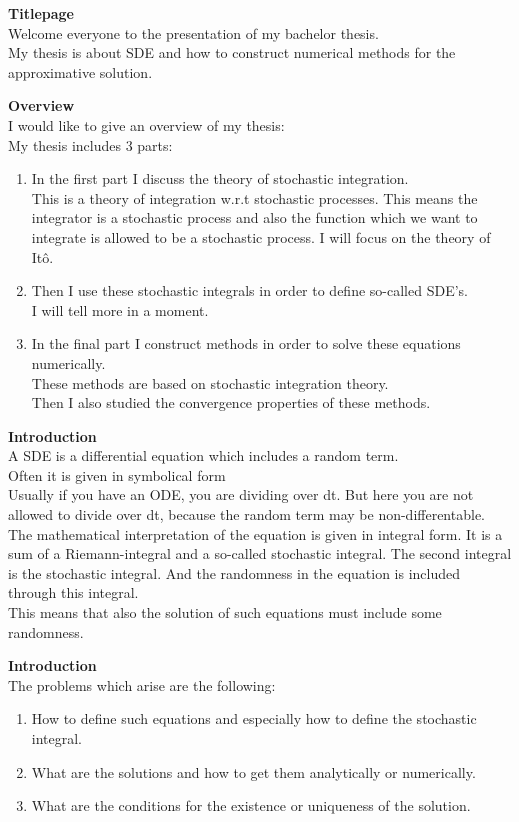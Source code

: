 \documentclass[10pt,a4paper,titlepage, openany]{memoir} %
\begin{document}
\textbf{Titlepage}\\
Welcome everyone to the presentation of my bachelor thesis.\\
My thesis is about SDE and how to construct numerical methods for the approximative solution.

\textbf{Overview}\\
I would like to give an overview of my thesis:\\
My thesis includes 3 parts:\\
\begin{enumerate}
\item In the first part I discuss the theory of stochastic integration.\\
This is a theory of integration w.r.t stochastic processes. This means the integrator is a stochastic process and also the function
which we want to integrate is allowed to be a stochastic process. I will focus on the theory of It\^o.
\item Then I use these stochastic integrals in order to define so-called SDE's.\\
I will tell more in a moment.
\item In the final part I construct methods in order to solve these equations numerically.\\
These methods are based on stochastic integration theory.\\
Then I also studied the convergence properties of these methods.
\end{enumerate}

\textbf{Introduction}\\
A SDE is a differential equation which includes a random term.\\ 
Often it is given in symbolical form\\
Usually if you have an ODE, you are dividing over dt. But here you are not allowed to divide over dt, because the random term may be non-differentable. \\
The mathematical interpretation of the equation is given in integral form. It is a sum of a Riemann-integral and a so-called stochastic integral. The second integral is the stochastic integral. And the randomness in the equation is included through this integral.\\
This means that also the solution of such equations must include some randomness.

\textbf{Introduction}\\
The problems which arise are the following:
\begin{enumerate}
\item How to define such equations and especially how to define the stochastic integral.
\item What are the solutions and how to get them analytically or numerically.
\item What are the conditions for the existence or uniqueness of the solution.
\end{enumerate}
\end{document}
